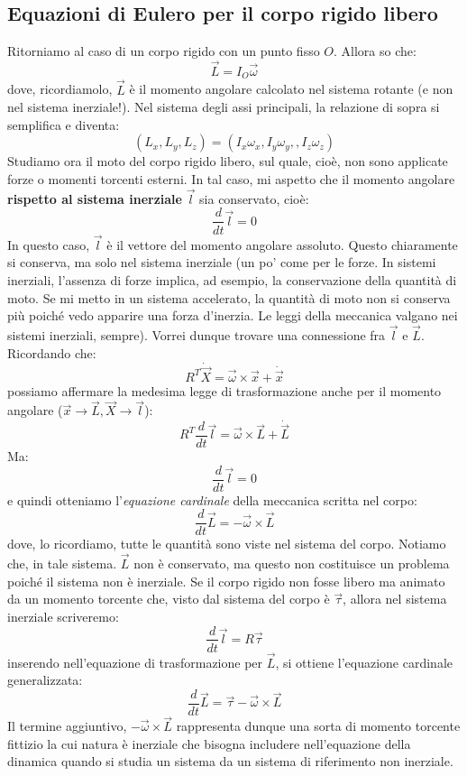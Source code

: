 \documentclass[a4paper,openany]{article}
\begin{document}
	\subsection{Equazioni di Eulero per il corpo rigido libero}
	Ritorniamo al caso di un corpo rigido con un punto fisso $O$. Allora so che:
	$$
	\vec{L} = I_{O}\vec\omega
	$$
	dove, ricordiamolo, $\vec{L}$ è il momento angolare calcolato nel sistema rotante (e non nel sistema inerziale!). Nel sistema degli assi principali, la relazione di sopra si semplifica e diventa:
	$$
	(L_x,L_y,L_z) = (I_x\omega_x,I_y\omega_y,,I_z\omega_z)
	$$
	Studiamo ora il moto del corpo rigido libero, sul quale, cioè, non sono applicate forze o momenti torcenti esterni. In tal caso, mi aspetto che il momento angolare \textbf{rispetto al sistema inerziale} $\vec{l}$ sia conservato, cioè:
	$$
	\dfrac{d}{dt}\vec{l} = 0
	$$
	In questo caso, $\vec{l}$ è il vettore del momento angolare assoluto. Questo chiaramente si conserva, ma solo nel sistema inerziale (un po' come per le forze. In sistemi inerziali, l'assenza di forze implica, ad esempio, la conservazione della quantità di moto. Se mi metto in un sistema accelerato, la quantità di moto non si conserva più poiché vedo apparire una forza d'inerzia. Le leggi della meccanica valgano nei sistemi inerziali, sempre). Vorrei dunque trovare una connessione fra $\vec{l}$ e $\vec{L}$. Ricordando che:
	$$
	R^{T}\dot{\vec{X}} = \vec{\omega}\times\vec{x} + \dot{\vec{x}}
	$$
	possiamo affermare la medesima legge di trasformazione anche per il momento angolare ($\vec{x} \rightarrow \vec{L}, \vec{X}\rightarrow\vec{l}$):
	\begin{equation}\label{key}
		R^{T}\dfrac{d}{dt}\vec{l} = \vec{\omega}\times\vec{L} + \dot{\vec{L}} 
	\end{equation}
	Ma:
	$$
	\dfrac{d}{dt}\vec{l} = 0
	$$
	e quindi otteniamo l'\textit{equazione cardinale} della meccanica scritta nel corpo:
	\begin{equation}
		\dfrac{d}{dt}\vec{L} = -\vec{\omega}\times\vec{L}
		\label{EqCard}
	\end{equation}
	dove, lo ricordiamo, tutte le quantità sono viste nel sistema del corpo. Notiamo che, in tale sistema. $\vec{L}$ non è conservato, ma questo non costituisce un problema poiché il sistema non è inerziale. Se il corpo rigido non fosse libero ma animato da un momento torcente che, visto dal sistema del corpo è $\vec{\tau}$, allora nel sistema inerziale scriveremo:
	$$
	\dfrac{d}{dt}\vec{l} = R\vec\tau
	$$
	inserendo nell'equazione di trasformazione per $\vec{L}$, si ottiene l'equazione cardinale generalizzata:
	\begin{equation}
		\dfrac{d}{dt}\vec{L} = \vec{\tau} - \vec{\omega}\times\vec{L}
	\end{equation}
	Il termine aggiuntivo, $-\vec{\omega}\times\vec{L}$ rappresenta dunque una sorta di momento torcente fittizio la cui natura è inerziale che bisogna includere nell'equazione della dinamica quando si studia un sistema da un sistema di riferimento non inerziale.
	
\end{document}
